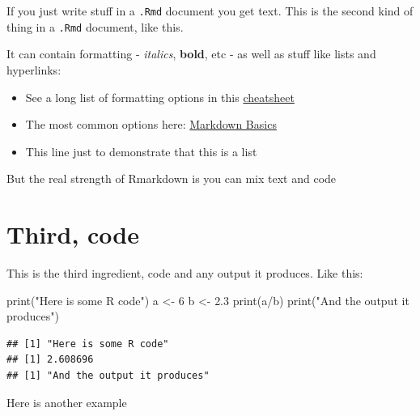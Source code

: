 \documentclass[
]{book}
\newenvironment{Shaded}{\begin{snugshade}}{\end{snugshade}}
\newcommand{\DecValTok}[1]{\textcolor[rgb]{0.00,0.00,0.81}{#1}}
\newcommand{\FloatTok}[1]{\textcolor[rgb]{0.00,0.00,0.81}{#1}}
\newcommand{\FunctionTok}[1]{\textcolor[rgb]{0.00,0.00,0.00}{#1}}
\newcommand{\NormalTok}[1]{#1}
\newcommand{\OtherTok}[1]{\textcolor[rgb]{0.56,0.35,0.01}{#1}}
\newcommand{\SpecialCharTok}[1]{\textcolor[rgb]{0.00,0.00,0.00}{#1}}
\newcommand{\StringTok}[1]{\textcolor[rgb]{0.31,0.60,0.02}{#1}}
\providecommand{\tightlist}{%
  \setlength{\itemsep}{0pt}\setlength{\parskip}{0pt}}
\begin{document}
If you just write stuff in a \texttt{.Rmd} document you get text. This is the second kind of thing in a \texttt{.Rmd} document, like this.

It can contain formatting - \emph{italics}, \textbf{bold}, etc - as well as stuff like lists and hyperlinks:

\begin{itemize}
\tightlist
\item
  See a long list of formatting options in this \href{https://rstudio.com/wp-content/uploads/2015/02/rmarkdown-cheatsheet.pdf}{cheatsheet}
\item
  The most common options here: \href{https://rmarkdown.rstudio.com/authoring_basics.html}{Markdown Basics}
\item
  This line just to demonstrate that this is a list
\end{itemize}

But the real strength of Rmarkdown is you can mix text and code

\hypertarget{third-code}{%
\section{Third, code}\label{third-code}}

This is the third ingredient, code and any output it produces. Like this:

\begin{Shaded}
\begin{Highlighting}[]
\FunctionTok{print}\NormalTok{(}\StringTok{"Here is some R code"}\NormalTok{)}
\NormalTok{a }\OtherTok{\textless{}{-}} \DecValTok{6}
\NormalTok{b }\OtherTok{\textless{}{-}} \FloatTok{2.3}
\FunctionTok{print}\NormalTok{(a}\SpecialCharTok{/}\NormalTok{b)}
\FunctionTok{print}\NormalTok{(}\StringTok{"And the output it produces"}\NormalTok{)}
\end{Highlighting}
\end{Shaded}

\begin{verbatim}
## [1] "Here is some R code"
## [1] 2.608696
## [1] "And the output it produces"
\end{verbatim}

Here is another example
\end{document}
